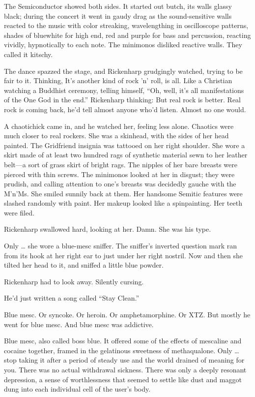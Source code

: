 The Semiconductor showed both sides. It started out butch, its walls glassy black; during the concert it went in gaudy drag as the sound-sensitive walls reacted to the music with color streaking, wavelengthing in oscilloscope patterns, shades of bluewhite for high end, red and purple for bass and percussion, reacting vividly, hypnotically to each note. The minimonos disliked reactive walls. They called it kitschy.

The dance spazzed the stage, and Rickenharp grudgingly watched, trying to be fair to it. Thinking, It’s another kind of rock ’n’ roll, is all. Like a Christian watching a Buddhist ceremony, telling himself, “Oh, well, it’s all manifestations of the One God in the end.” Rickenharp thinking: But real rock is better. Real rock is coming back, he’d tell almost anyone who’d listen. Almost no one would.

A chaotichick came in, and he watched her, feeling less alone. Chaotics were much closer to real rockers. She was a skinhead, with the sides of her head painted. The Gridfriend insignia was tattooed on her right shoulder. She wore a skirt made of at least two hundred rags of synthetic material sewn to her leather belt—a sort of grass skirt of bright rags. The nipples of her bare breasts were pierced with thin screws. The minimonos looked at her in disgust; they were prudish, and calling attention to one’s breasts was decidedly gauche with the M’n’Ms. She smiled sunnily back at them. Her handsome Semitic features were slashed randomly with paint. Her makeup looked like a spinpainting. Her teeth were filed.

Rickenharp swallowed hard, looking at her. Damn. She was his type.

Only … she wore a blue-mesc sniffer. The sniffer’s inverted question mark ran from its hook at her right ear to just under her right nostril. Now and then she tilted her head to it, and sniffed a little blue powder.

Rickenharp had to look away. Silently cursing.

He’d just written a song called “Stay Clean.”

Blue mesc. Or syncoke. Or heroin. Or amphetamorphine. Or XTZ. But mostly he went for blue mesc. And blue mesc was addictive.

Blue mesc, also called boss blue. It offered some of the effects of mescaline and cocaine together, framed in the gelatinous sweetness of methaqualone. Only … stop taking it after a period of steady use and the world drained of meaning for you. There was no actual withdrawal sickness. There was only a deeply resonant depression, a sense of worthlessness that seemed to settle like dust and maggot dung into each individual cell of the user’s body.

